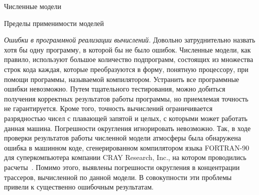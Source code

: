 \begin{chapter}{Численные модели}
\begin{section}{Пределы применимости моделей}

\emph{Ошибки в программной реализации вычислений.} 
Довольно затруднительно назвать хотя бы одну программу, в которой бы не было
ошибок. Численные модели, как правило, используют большое количество 
подпрограмм, состоящих из множества строк кода каждая, которые преобразуются
в форму, понятную процессору, при помощи программы, называемой компилятором.
Устранить все программные ошибки невозможно. Путем тщательного тестирования,
можно добиться получения корректных результатов работы программы, но 
приемлемая точность не гарантируется.
Кроме того, точность вычислений ограничивается разрядностью чисел с плавающей 
запятой и целых, с которыми может работать данная машина. 
Погрешности округления игнорировать невозможно. 
Так, в ходе проверки результатов работы численной модели атмосферы была 
обнаружена ошибка в машинном коде, сгенерированном компилятором языка
FORTRAN-90 для суперкомпьютера компании CRAY Research, Inc., на котором
проводились расчеты~\cite{Lawrence:1999}. Помимо этого, выявлены 
погрешности округления в концентрации трассеров, вычисленной по данной модели. 
В совокупности эти проблемы привели к существенно ошибочным результатам.
%


\end{section}
\end{chapter}
